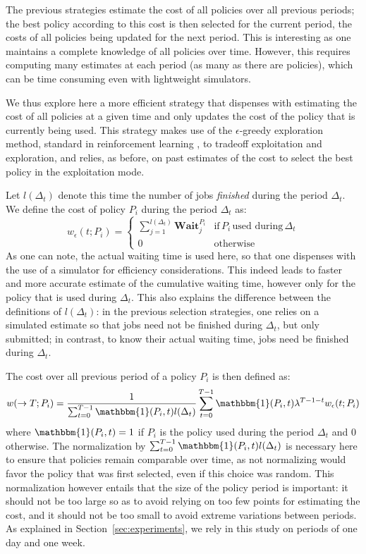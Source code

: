 \documentclass[sigconf]{acmart}
\begin{document}
The previous strategies estimate the cost of all policies over all previous periods; the best policy according to this cost is then selected for the current period, the costs of all policies being updated for the next period. This is interesting as one maintains a complete knowledge of all policies over time. However, this requires computing many estimates at each period (as many as there are policies), which can be time consuming even with lightweight simulators.

We thus explore here a more efficient strategy that dispenses with estimating the cost of all policies at a given time and only updates the cost of the policy that is currently being used. This strategy makes use of the $\epsilon$-greedy exploration method, standard in reinforcement learning \cite{Watkins:1989}, to tradeoff exploitation and exploration, and relies, as before, on past estimates of the cost to select the best policy in the exploitation mode.

Let $l(\Delta_t)$ denote this time the number of jobs \textit{finished} during the period $\Delta_t$. We define the cost of policy $P_i$ during the period $\Delta_t$ as:
%
\[
w_{\epsilon}(t;P_i) =
\left\{
\begin{array}{ll}
 \sum_{j=1}^{l(\Delta_t)} \textbf{Wait}_j^{P_i} & \mbox{if} \, P_i \, \mbox{used during} \, \Delta_t \nonumber\\
 0 & \mbox{otherwise}
 \end{array}
\right.
\]
%
As one can note, the actual waiting time is used here, so that one dispenses with the use of a simulator for efficiency considerations. This indeed leads to faster and more accurate estimate of the cumulative waiting time, however only for the policy that is used during $\Delta_t$. This also explains the difference between the definitions of $l(\Delta_t)$: in the previous selection strategies, one relies on a simulated estimate so that jobs need not be finished during $\Delta_t$, but only submitted; in contrast, to know their actual waiting time, jobs need be finished during $\Delta_t$.

The cost over all previous period of a policy $P_i$ is then defined as:
%
\begin{equation}
\label{eq:tot-cost-greedy}
w(\rightarrow T;P_i) = \frac{1}{\sum_{t=0}^{T-1} \mathbbm{1}(P_i,t) l(\Delta_t)} \sum_{t=0}^{T-1} \mathbbm{1}(P_i,t) \lambda^{T-1-t} w_{\epsilon}(t;P_i)
\end{equation}
%
where $\mathbbm{1}(P_i,t) = 1$ if $P_i$ is the policy used during the period $\Delta_t$ and $0$ otherwise. The normalization by $\sum_{t=0}^{T-1} \mathbbm{1}(P_i,t) l(\Delta_t)$ is necessary here to ensure that policies remain comparable over time, as not normalizing would favor the policy that was first selected, even if this choice was random. This normalization however entails that the size of the policy period is important: it should not be too large so as to avoid relying on too few points for estimating the cost, and it should not be too small to avoid extreme variations between periods. As explained in Section~\ref{sec:experiments}, we rely in this study on periods of one day and one week.
\end{document}
